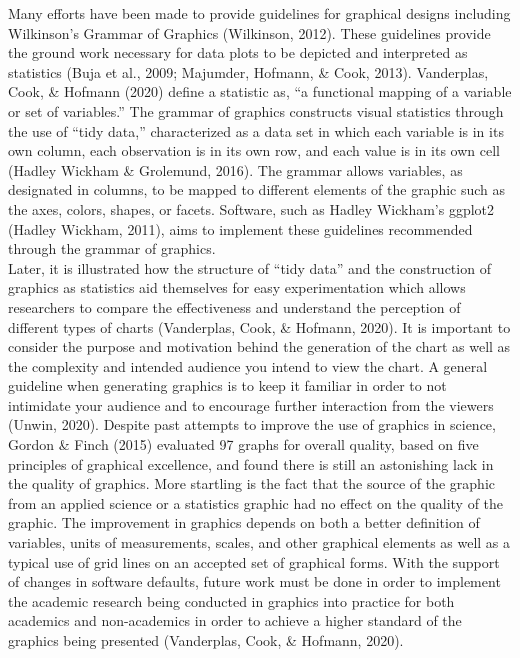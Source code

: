 \documentclass[print]{nuthesis}
\begin{document}
Many efforts have been made to provide guidelines for graphical designs including Wilkinson's Grammar of Graphics (Wilkinson, 2012).
These guidelines provide the ground work necessary for data plots to be depicted and interpreted as statistics (Buja et al., 2009; Majumder, Hofmann, \& Cook, 2013).
Vanderplas, Cook, \& Hofmann (2020) define a statistic as, ``a functional mapping of a variable or set of variables.''
The grammar of graphics constructs visual statistics through the use of ``tidy data,'' characterized as a data set in which each variable is in its own column, each observation is in its own row, and each value is in its own cell (Hadley Wickham \& Grolemund, 2016).
The grammar allows variables, as designated in columns, to be mapped to different elements of the graphic such as the axes, colors, shapes, or facets.
Software, such as Hadley Wickham's ggplot2 (Hadley Wickham, 2011), aims to implement these guidelines recommended through the grammar of graphics.\\
Later, it is illustrated how the structure of ``tidy data'' and the construction of graphics as statistics aid themselves for easy experimentation which allows researchers to compare the effectiveness and understand the perception of different types of charts (Vanderplas, Cook, \& Hofmann, 2020).
It is important to consider the purpose and motivation behind the generation of the chart as well as the complexity and intended audience you intend to view the chart. 
A general guideline when generating graphics is to keep it familiar in order to not intimidate your audience and to encourage further interaction from the viewers (Unwin, 2020).
Despite past attempts to improve the use of graphics in science, Gordon \& Finch (2015) evaluated 97 graphs for overall quality, based on five principles of graphical excellence, and found there is still an astonishing lack in the quality of graphics.
More startling is the fact that the source of the graphic from an applied science or a statistics graphic had no effect on the quality of the graphic.
The improvement in graphics depends on both a better definition of variables, units of measurements, scales, and other graphical elements as well as a typical use of grid lines on an accepted set of graphical forms.
With the support of changes in software defaults, future work must be done in order to implement the academic research being conducted in graphics into practice for both academics and non-academics in order to achieve a higher standard of the graphics being presented (Vanderplas, Cook, \& Hofmann, 2020).
\end{document}
